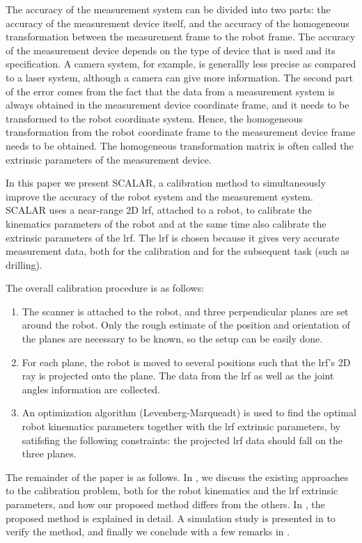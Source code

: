 The accuracy of the measurement system can be divided into two parts: the accuracy of the measurement device itself, and the accuracy of the homogeneous transformation between the measurement frame to the robot frame. The accuracy of the measurement device depends on the type of device that is used and its specification. A camera system, for example, is generallly less precise as compared to a laser system, although a camera can give more information. The second part of the error comes from the fact that the data from a measurement system is always obtained in the measurement device coordinate frame, and it needs to be transformed to the robot coordinate system. Hence, the homogeneous transformation from the robot coordinate frame to the measurement device frame needs to be obtained. The homogeneous transformation matrix is often called the extrinsic parameters of the measurement device. 

In this paper we present SCALAR, a calibration method to simultaneously improve the accuracy of the robot system and the measurement system. SCALAR uses a near-range 2D \ac{lrf}, attached to a robot, to calibrate the kinematics parameters of the robot and at the same time also calibrate the extrinsic parameters of the \ac{lrf}. The \ac{lrf} is chosen because it gives very accurate measurement data, both for the calibration and for the subsequent task (such as drilling).  

The overall calibration procedure is as follows:
\begin{enumerate}
\item The scanner is attached to the robot, and three perpendicular planes are set around the robot. Only the rough estimate of the position and orientation of the planes are necessary to be known, so the setup can be easily done.
\item For each plane, the robot is moved to several positions such that the \ac{lrf}'s 2D ray is projected onto the plane. The data from the \ac{lrf} as well as the joint angles information are collected.
\item An optimization algorithm (Levenberg-Marqueadt) is used to find the optimal robot kinematics parameters together with the \ac{lrf} extrinsic parameters, by satifsfing the following constraints: the projected \ac{lrf} data should fall on the three planes. 
\end{enumerate}

The remainder of the paper is as follows. In , we discuss the existing approaches to the calibration problem, both for the robot kinematics and the \ac{lrf} extrinsic parameters, and how our proposed method differs from the others. In , the proposed method is explained in detail. A simulation study is presented in  to verify the method, and finally we conclude with a few remarks in .  

